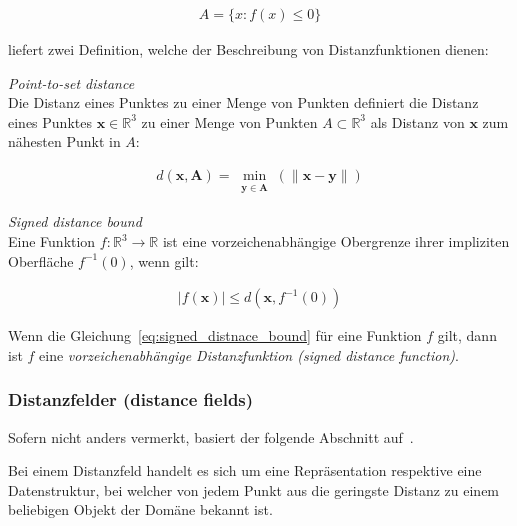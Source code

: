 \begin{gather}
    A = \{ x : f(x) \leq 0 \}
\end{gather}

\cite{hart_sphere_1994} liefert zwei Definition, welche der Beschreibung von Distanzfunktionen dienen:

\theoremstyle{definition}
\begin{definition}{\label{theo:point_to_set_distance}
    \textit{Point-to-set distance}}\\
    Die Distanz eines Punktes zu einer Menge von Punkten definiert die Distanz
    eines Punktes $ \bm{x} \in \mathbb{R}^{3} $ zu einer Menge von Punkten $A
    \subset \mathbb{R}^{3}$ als Distanz von $\bm{x}$ zum nähesten Punkt in $A$:

    \begin{gather}
        d(\bm{x}, \bm{A}) = \min_{\substack{\bm{y} \in \bm{A}}}(\|\bm{x} - \bm{y}\|)
    \end{gather}
\end{definition}

\theoremstyle{definition}
\begin{definition}{\label{theo:signed_distnace_bound}
    \textit{Signed distance bound}}\\ 
    Eine Funktion $ f : \mathbb{R}^{3} \to \mathbb{R} $ ist eine
    vorzeichenabhängige Obergrenze ihrer impliziten Oberfläche $ f^{-1}(0)$,
    wenn gilt:

    \begin{gather}\label{eq:signed_distnace_bound}
        |f(\bm{x})| \leq d(\bm{x}, f^{-1}(0))
    \end{gather}
\end{definition}

Wenn die Gleichung~\ref{eq:signed_distnace_bound} für eine Funktion $f$ gilt,
dann ist $f$ eine \textit{vorzeichenabhängige Distanzfunktion (signed distance
    function)}.

\subsubsection{Distanzfelder (distance fields)}
\label{ssubsec:distance_fields}


Sofern nicht anders vermerkt, basiert der folgende Abschnitt
auf~\cite{jones_3d_2006}.

Bei einem Distanzfeld handelt es sich um eine Repräsentation respektive eine
Datenstruktur, bei welcher von jedem Punkt aus die geringste Distanz zu
einem beliebigen Objekt der Domäne bekannt ist.


